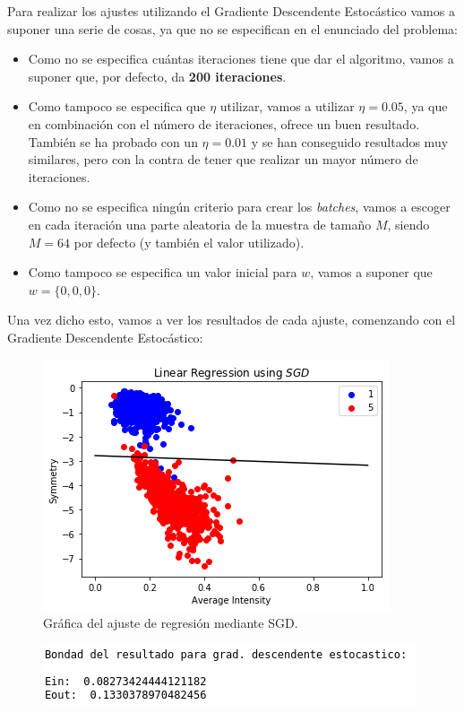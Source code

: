 \documentclass[11pt,a4paper]{article}
\begin{document}
Para realizar los ajustes utilizando el Gradiente Descendente Estocástico vamos a suponer una serie de cosas, ya que no
se especifican en el enunciado del problema:

\begin{itemize}[label=\textbullet]
	\item Como no se especifica cuántas iteraciones tiene que dar el algoritmo, vamos a suponer que, por defecto, da
	\textbf{200 iteraciones}.
	\item Como tampoco se especifica que $\eta$ utilizar, vamos a utilizar $\eta = 0.05$, ya que en combinación con el
	número de iteraciones, ofrece un buen resultado. También se ha probado con un $\eta = 0.01$ y se han conseguido
	resultados muy similares, pero con la contra de tener que realizar un mayor número de iteraciones.
	\item Como no se especifica ningún criterio para crear los \textit{batches}, vamos a escoger en cada iteración una
	parte aleatoria de la muestra de tamaño $M$, siendo $M = 64$ por defecto (y también el valor utilizado).
	\item Como tampoco se especifica un valor inicial para $w$, vamos a suponer que $w = \lbrace 0, 0, 0 \rbrace$.
\end{itemize}

Una vez dicho esto, vamos a ver los resultados de cada ajuste, comenzando con el Gradiente Descendente Estocástico:

\begin{figure}[H]
\centering
\includegraphics[scale=0.8]{img/sgd_regression.png}
\caption{Gráfica del ajuste de regresión mediante SGD.}
\end{figure}

\begin{figure}[H]
\centering
\includegraphics[scale=0.6]{img/sgd_regression_error.png}
\end{figure}
\end{document}
